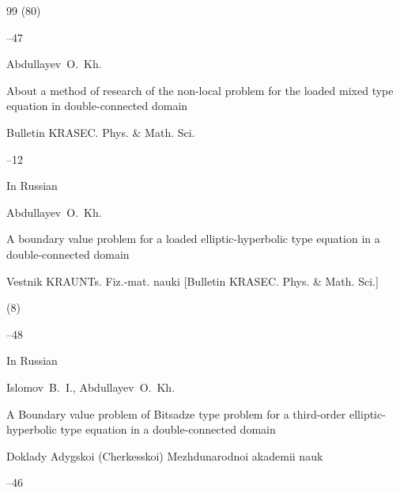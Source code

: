 \begin{thebibliography}{99}
(80)

--47








\by Abdullayev~O.~Kh.

\paper About a method of research of the non-local problem for the loaded mixed type equation in double-connected domain

\jour Bulletin KRASEC. Phys. \& Math. Sci.




--12






\lang In Russian

\by Abdullayev~O.~Kh.

\paper A boundary value problem for a loaded elliptic-hyperbolic type equation  in a double-connected domain

\jour Vestnik KRAUNTs. Fiz.-mat. nauki \rm [Bulletin KRASEC. Phys. \& Math. Sci.]


(8)

--48






 


\lang In Russian

\by Islomov~B.~I., Abdullayev~O.~Kh.

\paper A Boundary value problem of Bitsadze type problem for a third-order  elliptic-hyperbolic type equation in a double-connected domain

\jour Doklady Adygskoi (Cherkesskoi) Mezhdunarodnoi akademii nauk




--46

 




\end{thebibliography}

